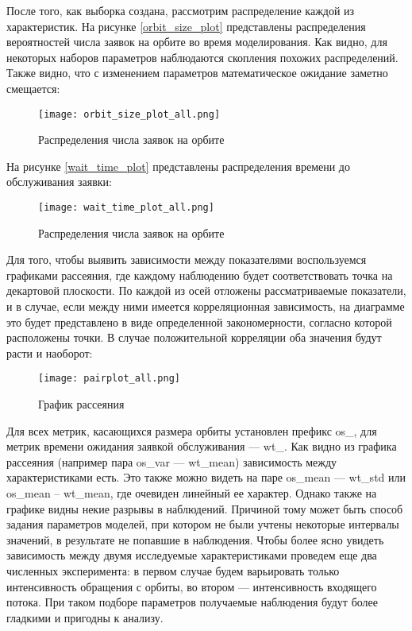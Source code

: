 После того, как выборка создана, рассмотрим распределение каждой из характеристик. На рисунке \ref{orbit_size_plot} представлены распределения вероятностей числа заявок на орбите во время моделирования. Как видно, для некоторых наборов параметров наблюдаются скопления похожих распределений. Также видно, что с изменением параметров математическое ожидание заметно смещается:

\begin{figure}[H]
	\centering
	\texttt{[image: orbit\_size\_plot\_all.png]}
	\caption{Распределения числа заявок на орбите} 
	\label{orbit_size_plot_all}
\end{figure}

На рисунке \ref{wait_time_plot} представлены распределения времени до обслуживания заявки:

\begin{figure}[H]
	\centering
	\texttt{[image: wait\_time\_plot\_all.png]}
	\caption{Распределения числа заявок на орбите} 
	\label{wait_time_plot_all}
\end{figure}

Для того, чтобы выявить зависимости между показателями воспользуемся графиками рассеяния, где каждому наблюдению будет соответствовать точка на декартовой плоскости. По каждой из осей отложены рассматриваемые показатели, и в случае, если между ними имеется корреляционная зависимость, на диаграмме это будет представлено в виде определенной закономерности, согласно которой расположены точки. В случае положительной корреляции оба значения будут расти и наоборот:
\begin{figure}[H]
	\centering
	\texttt{[image: pairplot\_all.png]}
	\caption{График рассеяния} 
	\label{os_wt_pairplot_all}
\end{figure}

Для всех метрик, касающихся размера орбиты установлен префикс os\_, для метрик времени ожидания заявкой обслуживания --- wt\_. Как видно из графика рассеяния (например пара os\_var --- wt\_mean) зависимость между характеристиками есть. Это также можно видеть на паре os\_mean --- wt\_std или os\_mean -- wt\_mean, где очевиден линейный ее характер. Однако также на графике видны некие разрывы в наблюдений. Причиной тому может быть способ задания параметров моделей, при котором не были учтены некоторые интервалы значений, в результате не попавшие в наблюдения. Чтобы более ясно увидеть зависимость между двумя исследуемые характеристиками проведем еще два численных эксперимента: в первом случае будем варьировать только интенсивность обращения с орбиты, во втором --- интенсивность входящего потока. При таком подборе параметров получаемые наблюдения будут более гладкими и пригодны к анализу.

